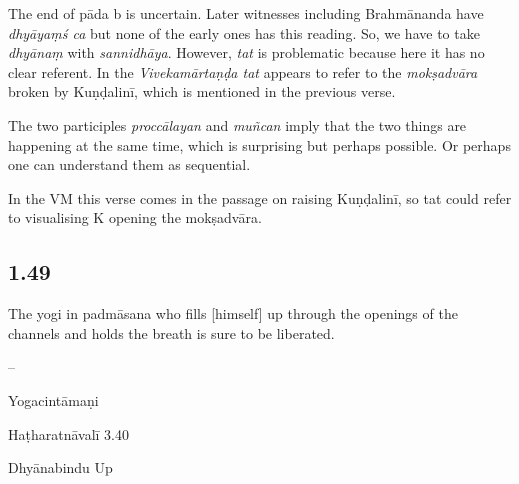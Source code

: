 \begin{ekdosis}
\begin{philcomm}[hp01_048]
The end of pāda b is uncertain. Later witnesses including Brahmānanda have \emph{dhyāyaṃś ca} but none of the early ones has this reading. So, we have to take \emph{dhyānaṃ} with \emph{sannidhāya}. However, \emph{tat} is problematic because here it has no clear referent. In the \emph{Vivekamārtaṇḍa tat} appears to refer to the \emph{mokṣadvāra} broken by Kuṇḍalinī, which is mentioned in the previous verse.

The two participles \emph{proccālayan} and \emph{muñcan} imply that the two things are happening at the same time, which is surprising but perhaps possible. Or perhaps one can understand them as sequential.

In the VM this verse comes in the passage on raising Kuṇḍalinī, so tat could refer to visualising K opening the mokṣadvāra.
\end{philcomm}

\subsection*{1.49}
\begin{translation}[hp01_049]
The yogi in padmāsana who fills [himself] up through the openings of the channels and holds the breath is sure to be liberated.
\end{translation}

\begin{sources}[hp01_049]
--
\end{sources}

\begin{testimonia}[hp01_049]
Yogacintāmaṇi

\begin{versinnote}
\end{versinnote}

Haṭharatnāvalī 3.40

\begin{versinnote}
\end{versinnote}

Dhyānabindu Up

\begin{versinnote}
\end{versinnote}


\end{testimonia}
\end{ekdosis}
